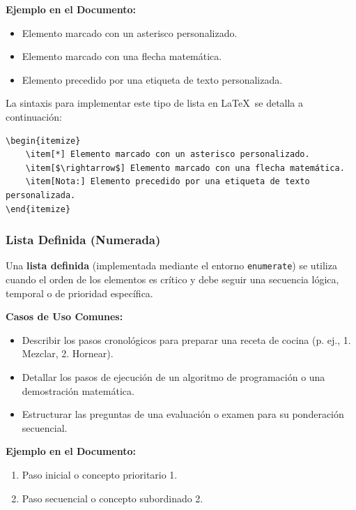 \documentclass[11pt, a4paper]{article}
\begin{document}
\vspace{0.3cm}
\noindent\textbf{Ejemplo en el Documento:}
\begin{itemize}
    \item[*] Elemento marcado con un asterisco personalizado.
    \item[$\rightarrow$] Elemento marcado con una flecha matemática.
    \item[Nota:] Elemento precedido por una etiqueta de texto personalizada.
\end{itemize} 

La sintaxis para implementar este tipo de lista en \LaTeX\ se detalla a continuación:

\begin{lstlisting}[caption={Código para listas no numeradas personalizadas}]
\begin{itemize}
    \item[*] Elemento marcado con un asterisco personalizado.
    \item[$\rightarrow$] Elemento marcado con una flecha matemática.
    \item[Nota:] Elemento precedido por una etiqueta de texto personalizada.
\end{itemize} 
\end{lstlisting}

\subsubsection{Lista Definida (Numerada)}
Una \textbf{lista definida} (implementada mediante el entorno \texttt{enumerate}) se utiliza cuando el orden de los elementos es crítico y debe seguir una secuencia lógica, temporal o de prioridad específica.

\vspace{0.3cm}
\noindent\textbf{Casos de Uso Comunes:}
\begin{itemize}
    \item Describir los pasos cronológicos para preparar una receta de cocina (p. ej., 1. Mezclar, 2. Hornear).
    \item Detallar los pasos de ejecución de un algoritmo de programación o una demostración matemática.
    \item Estructurar las preguntas de una evaluación o examen para su ponderación secuencial.
\end{itemize}

\vspace{0.3cm}
\noindent\textbf{Ejemplo en el Documento:}
\begin{enumerate}
  \item Paso inicial o concepto prioritario 1.
  \item Paso secuencial o concepto subordinado 2.
\end{enumerate} 
\end{document}
